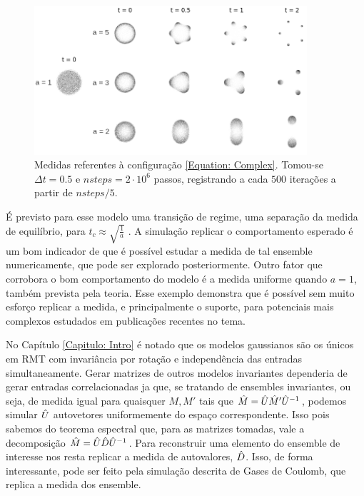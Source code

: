 \begin{figure}[ht]
	\centering
	\includegraphics[width=0.9\textwidth]{Assets/complexPotential.png}
	\caption{Medidas referentes à configuração \ref{Equation: Complex}. Tomou-se $\Delta t = 0.5$ e $nsteps = 2\cdot10^6$ passos, registrando a cada $500$ iterações a partir de $nsteps/5$.}
	\label{Figura: Complex}
\end{figure}

É previsto para esse modelo uma transição de regime, uma separação da medida de equilíbrio, para $t_c \approx \sqrt{\frac{1}{a}}$ \cite{balogh2016orthogonal}. A simulação replicar o comportamento esperado é um bom indicador de que é possível estudar a medida de tal ensemble numericamente, que pode ser explorado posteriormente. Outro fator que corrobora o bom comportamento do modelo é a medida uniforme quando $a=1$, também prevista pela teoria. Esse exemplo demonstra que é possível sem muito esforço replicar a medida, e principalmente o suporte, para potenciais mais complexos estudados em publicações recentes no tema. 

No Capítulo \ref{Capitulo: Intro} é notado que os modelos gaussianos são os únicos em RMT com invariância por rotação e independência das entradas simultaneamente. Gerar matrizes de outros modelos invariantes dependeria de gerar entradas correlacionadas ja que, se tratando de ensembles invariantes, ou seja, de medida igual para quaisquer $M, M'$ tais que $\hat M = \hat U \hat M' \hat U^{-1}$, podemos simular $\hat U$ autovetores uniformemente do espaço correspondente. Isso pois sabemos do teorema espectral que, para as matrizes tomadas, vale a decomposição $\hat M = \hat U \hat D \hat U^{-1}$. Para reconstruir uma elemento do ensemble de interesse nos resta replicar a medida de autovalores, $\hat D$. Isso, de forma interessante, pode ser feito pela simulação descrita de Gases de Coulomb, que replica a medida dos ensemble.

